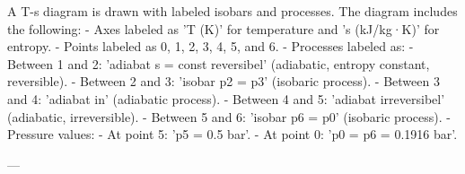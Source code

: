 A T-s diagram is drawn with labeled isobars and processes. The diagram includes the following:  
- Axes labeled as 'T (K)' for temperature and 's (kJ/kg·K)' for entropy.  
- Points labeled as 0, 1, 2, 3, 4, 5, and 6.  
- Processes labeled as:  
  - Between 1 and 2: 'adiabat s = const reversibel' (adiabatic, entropy constant, reversible).  
  - Between 2 and 3: 'isobar p2 = p3' (isobaric process).  
  - Between 3 and 4: 'adiabat in' (adiabatic process).  
  - Between 4 and 5: 'adiabat irreversibel' (adiabatic, irreversible).  
  - Between 5 and 6: 'isobar p6 = p0' (isobaric process).  
- Pressure values:  
  - At point 5: 'p5 = 0.5 bar'.  
  - At point 0: 'p0 = p6 = 0.1916 bar'.  

---
